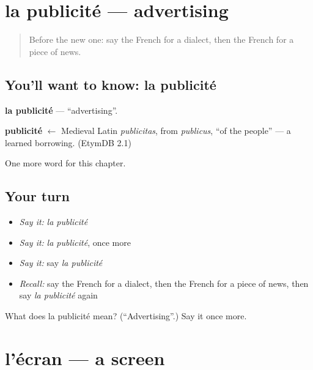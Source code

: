 \section[la publicité]{la publicité — advertising}

\label{lesson:FR-C195-publicite}



\begin{quote}
Before the new one: say the French for a dialect, then the French for a piece of news.
\end{quote}

\subsection*{You'll want to know: la publicité}
\textbf{la publicité} — \textquotedblleft{}advertising\textquotedblright{}.

\begin{cousinweb}
\textbf{publicité} $\leftarrow$ Medieval Latin \emph{publicitas}, from \emph{publicus}, \textquotedblleft{}of the people\textquotedblright{} — a learned borrowing. (EtymDB 2.1)
\end{cousinweb}

\begin{grammarlens}[title={What you've built}]
One more word for this chapter.
\end{grammarlens}

\subsection*{Your turn}
\begin{itemize}
\raggedright
  \item \emph{Say it:} \emph{la publicité}
  \item \emph{Say it:} \emph{la publicité}, once more
  \item \emph{Say it:} say \emph{la publicité}
  \item \emph{Recall:} say the French for a dialect, then the French for a piece of news, then say \emph{la publicité} again
\end{itemize}

\begin{tcolorbox}[breakable,colback=teal!4,colframe=teal!35!black,title={Before you move on}]
What does la publicité mean? (\textquotedblleft{}Advertising\textquotedblright{}.) Say it once more.
\end{tcolorbox}
\section[l'écran]{l'écran — a screen}

